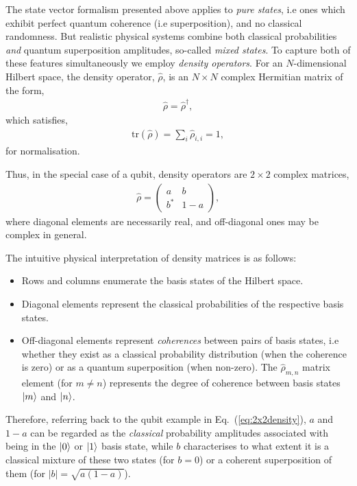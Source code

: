 The state vector formalism presented above applies to \textit{pure states}, i.e ones which exhibit perfect quantum coherence (i.e superposition), and no classical randomness. But realistic physical systems combine both classical probabilities \textit{and} quantum superposition amplitudes, so-called \textit{mixed states}. To capture both of these features simultaneously we employ \textit{density operators}. For an $N$-dimensional Hilbert space, the density operator, $\hat\rho$, is an \mbox{$N\times N$} complex Hermitian matrix of the form,
\begin{align}
	\hat\rho = \hat\rho^\dag,
\end{align}
which satisfies,
\begin{align}
\mathrm{tr}(\hat\rho)=\sum_i \hat\rho_{i,i} = 1,	
\end{align}
for normalisation.

Thus, in the special case of a qubit, density operators are \mbox{$2\times 2$} complex matrices,
\begin{align}\label{eq:2x2density}
\hat\rho = \begin{pmatrix}
  a & b \\
  b^* & 1-a
\end{pmatrix},
\end{align}
where diagonal elements are necessarily real, and off-diagonal ones may be complex in general.

The intuitive physical interpretation of density matrices is as follows:
\begin{itemize}
\item Rows and columns enumerate the basis states of the Hilbert space.
\item Diagonal elements represent the classical probabilities of the respective basis states.
\item Off-diagonal elements represent \textit{coherences} between pairs of basis states, i.e whether they exist as a classical probability distribution (when the coherence is zero) or as a quantum superposition (when non-zero). The $\hat\rho_{m,n}$ matrix element (for \mbox{$m\neq n$}) represents the degree of coherence between basis states $|m\rangle$ and $|n\rangle$.
\end{itemize}

Therefore, referring back to the qubit example in Eq.~(\ref{eq:2x2density}), $a$ and \mbox{$1-a$} can be regarded as the \textit{classical} probability amplitudes associated with being in the $|0\rangle$ or $|1\rangle$ basis state, while $b$ characterises to what extent it is a classical mixture of these two states (for \mbox{$b=0$}) or a coherent superposition of them (for \mbox{$|b|=\sqrt{a(1-a)}$}).


